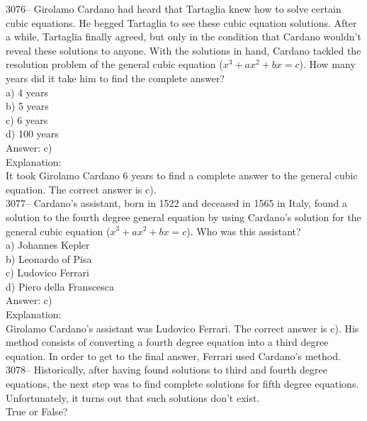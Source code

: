 \documentclass[letterpaper, 12pt]{article}
\begin{document}
3076-- Girolamo Cardano had heard that Tartaglia knew how to solve certain cubic equations. He begged Tartaglia to see these cubic equation solutions. After a while, Tartaglia finally agreed, but only in the condition that Cardano wouldn't reveal these solutions to anyone. With the solutions in hand, Cardano tackled the resolution problem of the general cubic equation  ($x^{3} + ax^{2} + bx =c$). How many years did it take him to find the complete answer?\\

a) 4 years\\
b) 5 years\\
c) 6 years\\
d) 100 years\\

Answer: c)\\

Explanation:\\
It took Girolamo Cardano 6 years to find a complete answer to the general cubic equation. The correct answer is c).\\



3077-- Cardano's assistant, born in 1522 and deceased in 1565 in Italy, found a solution to the fourth degree general equation by using Cardano's solution for the general cubic equation ($x^{3} + ax^{2} + bx =c$). Who was this assistant?\\

a) Johannes Kepler\\
b) Leonardo of Pisa\\
c) Ludovico Ferrari\\
d) Piero della Franscesca\\

Answer: c)\\

Explanation:\\
Girolamo Cardano's assistant was Ludovico Ferrari. The correct answer is c). His method consists of converting a fourth degree equation into a third degree equation. In order to get to the final answer, Ferrari used Cardano's method.\\



3078-- Historically, after having found solutions to third and fourth degree equations, the next step was to find complete solutions for fifth degree equations. Unfortunately, it turns out that such solutions don't exist.\\
True or False?\\
\end{document}
